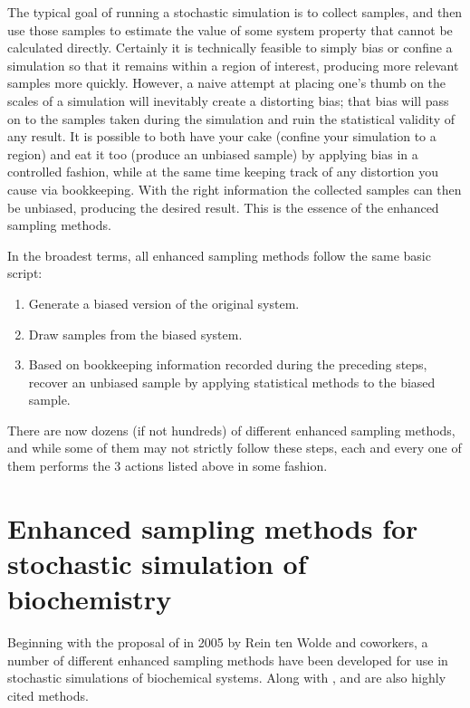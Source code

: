 The typical goal of running a stochastic simulation is to collect samples, and then use those samples to estimate the value of some system property that cannot be calculated directly. Certainly it is technically feasible to simply bias or confine a simulation so that it remains within a region of interest, producing more relevant samples more quickly. However, a naive attempt at placing one's thumb on the scales of a simulation will inevitably create a distorting bias; that bias will pass on to the samples taken during the simulation and ruin the statistical validity of any result. It is possible to both have your cake (confine your simulation to a region) and eat it too (produce an unbiased sample) by applying bias in a controlled fashion, while at the same time keeping track of any distortion you cause via bookkeeping. With the right information the collected samples can then be unbiased, producing the desired result. This is the essence of the enhanced sampling methods.

In the broadest terms, all enhanced sampling methods follow the same basic script:
\begin{enumerate}
    \item Generate a biased version of the original system.
    \item Draw samples from the biased system.
    \item Based on bookkeeping information recorded during the preceding steps, recover an unbiased sample by applying statistical methods to the biased sample. 
\end{enumerate}
There are now dozens (if not hundreds) of different enhanced sampling methods, and while some of them may not strictly follow these steps, each and every one of them performs the 3 actions listed above in some fashion.

\section{Enhanced sampling methods for stochastic simulation of biochemistry}

Beginning with the proposal of  in 2005\supercite{Allen:2005wy} by Rein ten Wolde and coworkers, a number of different enhanced sampling methods have been developed for use in stochastic simulations of biochemical systems. Along with ,  and  are also highly cited methods.

